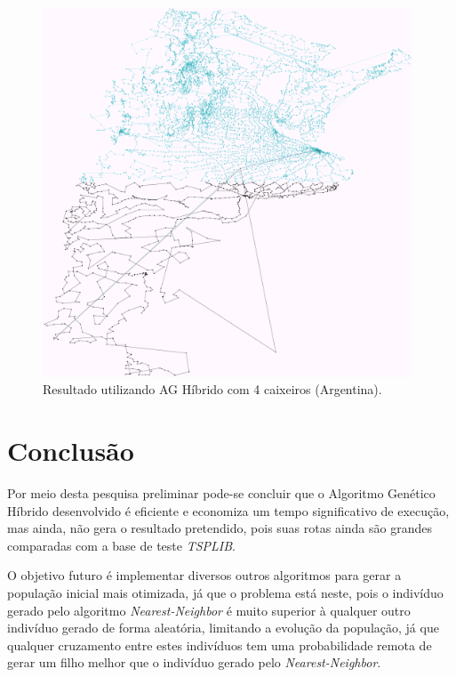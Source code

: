 \documentclass{abnt}
\begin{document}
	   	\begin{figure}[h]
				\centering
		        \includegraphics[width = 11cm,keepaspectratio]{img/output-nn-4}
		        \caption{Resultado utilizando AG Híbrido com 4 caixeiros (Argentina).}
		        \label{tgan4}
	   	\end{figure}
		
		\chapter{Conclusão}
		
	 Por meio desta pesquisa preliminar pode-se concluir que o Algoritmo Genético Híbrido desenvolvido é eficiente e economiza um tempo significativo de execução, mas ainda, não gera o resultado pretendido, pois suas rotas ainda são grandes comparadas com a base de teste \textit{TSPLIB}.
	 
	 O objetivo futuro é implementar diversos outros algoritmos para gerar a população inicial mais otimizada, já que o problema está neste, pois o indivíduo gerado pelo algoritmo \textit{Nearest-Neighbor} é muito superior à qualquer outro indivíduo gerado de forma aleatória, limitando a evolução da população, já que qualquer cruzamento entre estes indivíduos tem uma probabilidade remota de gerar um filho melhor que o indivíduo gerado pelo \textit{Nearest-Neighbor}.
		
		
	
\end{document}
